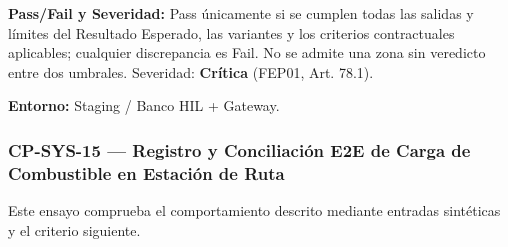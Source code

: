 \par\noindent\textbf{Pass/Fail y Severidad:} Pass únicamente si se cumplen todas las salidas y límites del Resultado Esperado, las variantes y los criterios contractuales aplicables; cualquier discrepancia es Fail. No se admite una zona sin veredicto entre dos umbrales. Severidad: \textbf{Crítica} (FEP01, Art. 78.1).\par
\par\noindent\textbf{Entorno:} Staging / Banco HIL + Gateway.\par






\subsubsection*{CP-SYS-15 — Registro y Conciliación E2E de Carga de Combustible en Estación de Ruta}\label{sec:9-cp-sys-15}
Este ensayo comprueba el comportamiento descrito mediante entradas sintéticas y el criterio siguiente.

